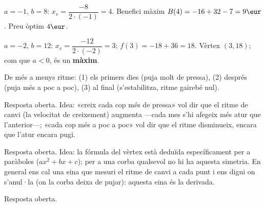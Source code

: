 \begin{solucions}
\begin{sollist}
  \item $a=-1$, $b=8$: $x_v=\dfrac{-8}{2\cdot(-1)}=4$. Benefici màxim
        $B(4)=-16+32-7=9\eur$. Preu òptim $4\eur$.
  \item $a=-2$, $b=12$: $x_v=\dfrac{-12}{2\cdot(-2)}=3$; $f(3)=-18+36=18$. Vèrtex
        $(3,18)$; com que $a<0$, és un \textbf{màxim}.
  \item De més a menys ritme: (1) els primers dies (puja molt de pressa), (2) després
        (puja més a poc a poc), (3) al final (s'estabilitza, ritme gairebé nul).
  \item Resposta oberta. Idea: «creix cada cop més de pressa» vol dir que el ritme de
        canvi (la velocitat de creixement) augmenta —cada mes s'hi afegeix més atur que
        l'anterior—; «cada cop més a poc a poc» vol dir que el ritme disminueix, encara
        que l'atur encara pugi.
  \item Resposta oberta. Idea: la fórmula del vèrtex està deduïda específicament per a
        paràboles ($ax^2+bx+c$); per a una corba qualsevol no hi ha aquesta simetria.
        En general ens cal una eina que mesuri el ritme de canvi a cada punt i ens digui
        on s'anul·la (on la corba deixa de pujar): aquesta eina és la derivada.
  \item Resposta oberta.
\end{sollist}
\end{solucions}
